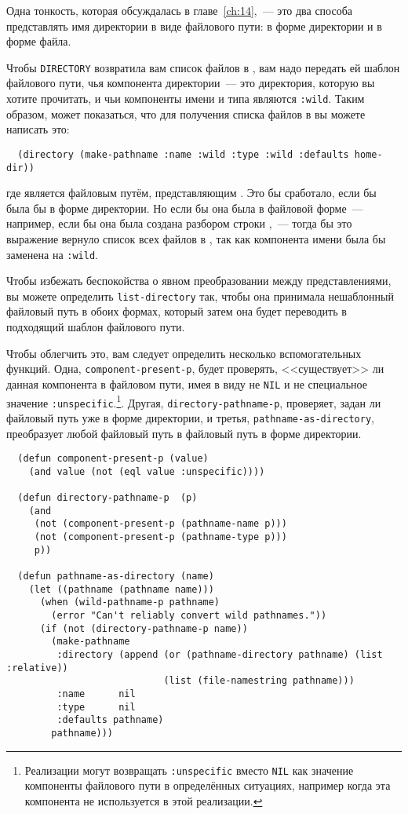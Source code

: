 Одна тонкость, которая обсуждалась в главе~\ref{ch:14},~--- это два способа представлять
имя директории в виде файлового пути: в форме директории и в форме файла.

Чтобы \lstinline{DIRECTORY} возвратила вам список файлов в , вам надо
передать ей шаблон файлового пути, чья компонента директории~--- это директория, которую
вы хотите прочитать, и чьи компоненты имени и типа являются \lstinline{:wild}. Таким образом,
может показаться, что для получения списка файлов в  вы можете написать
это:

\begin{lstlisting}
  (directory (make-pathname :name :wild :type :wild :defaults home-dir))
\end{lstlisting}

\noindent{}где  является файловым путём, представляющим . Это бы
сработало, если бы  была бы в форме директории. Но если бы она была в
файловой форме~--- например, если бы она была создана разбором строки
,~--- тогда бы это выражение вернуло список всех файлов в
, так как компонента имени  была бы заменена на
\lstinline{:wild}.

Чтобы избежать беспокойства о явном преобразовании между представлениями, вы можете
определить \lstinline{list-directory} так, чтобы она принимала нешаблонный файловый путь в
обоих формах, который затем она будет переводить в подходящий шаблон файлового пути.

Чтобы облегчить это, вам следует определить несколько вспомогательных функций. Одна,
\lstinline{component-present-p}, будет проверять, <<существует>> ли данная компонента в файловом
пути, имея в виду не \lstinline{NIL} и не специальное значение
\lstinline{:unspecific}.\footnote{Реализации могут возвращать \lstinline{:unspecific} вместо
  \lstinline{NIL} как значение компоненты файлового пути в определённых ситуациях, например
  когда эта компонента не используется в этой реализации.}. Другая,
\lstinline{directory-pathname-p}, проверяет, задан ли файловый путь уже в форме директории, и
третья, \lstinline{pathname-as-directory}, преобразует любой файловый путь в файловый путь в
форме директории.

\begin{lstlisting}
  (defun component-present-p (value)
    (and value (not (eql value :unspecific))))

  (defun directory-pathname-p  (p)
    (and
     (not (component-present-p (pathname-name p)))
     (not (component-present-p (pathname-type p)))
     p))

  (defun pathname-as-directory (name)
    (let ((pathname (pathname name)))
      (when (wild-pathname-p pathname)
        (error "Can't reliably convert wild pathnames."))
      (if (not (directory-pathname-p name))
        (make-pathname
         :directory (append (or (pathname-directory pathname) (list :relative))
                            (list (file-namestring pathname)))
         :name      nil
         :type      nil
         :defaults pathname)
        pathname)))
\end{lstlisting}

